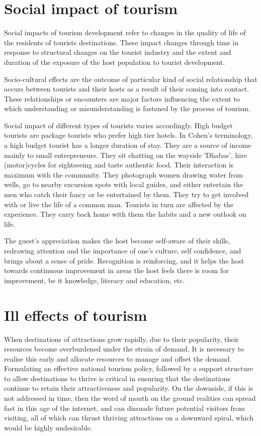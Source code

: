 
\section{Social impact of tourism} %
\label{sec:simt}

Social impacts of tourism development refer to changes in the quality of life of the residents of tourists destinations. These impact changes through time in response to structural changes on the tourist industry and the extent and duration of the exposure of the host population to tourist development.

Socio-cultural effects are the outcome of particular kind of social relationship that occurs between tourists and their hosts as a result of their coming into contact. These relationships or encounters are major factors influencing the extent to which understanding or misunderstanding is fastened by the process of tourism.

Social impact of different types of tourists varies accordingly. High budget tourists are package tourists who prefer high tier hotels. In Cohen's terminology, a high budget tourist has a longer duration of stay. They are a source of income mainly to small entrepreneurs. They sit chatting on the wayside 'Dhabas', hire (motor)cycles for sightseeing and taste authentic food. Their interaction is maximum with the community. They photograph women drawing water from wells, go to nearby excursion spots with local guides, and either entertain the men who catch their fancy or be entertained by them. They try to get involved with or live the life of a common man. Tourists in turn are affected by the experience. They carry back home with them the habits and a new outlook on life.

The guest's appreciation makes the host become self-aware of their skills, redrawing attention and the importance of one's culture, self confidence, and brings about a sense of pride. Recognition is reinforcing, and it helps the host towards continuous improvement in areas the host feels there is room for improvement, be it knowledge, literacy and education, etc.


\section{Ill effects of tourism} %
\label{sec:iet}

When destinations of attractions grow rapidly, due to their popularity, their resources become overburdened under the strain of demand. It is necessary to realise this early and allocate resources to manage and offset the demand. Formulating an effective national tourism policy, followed by a support structure to allow destinations to thrive is critical in ensuring that the destinations continue to retain their attractiveness and popularity. On the downside, if this is not addressed in time, then the word of mouth on the ground realities can spread fast in this age of the internet, and can dissuade future potential visitors from visiting, all of which can thrust thriving attractions on a downward spiral, which would be highly undesirable.


